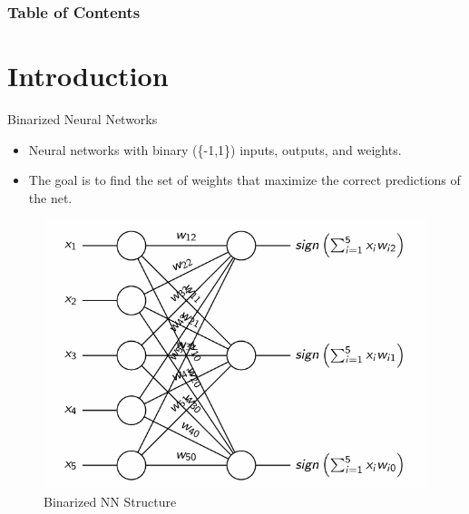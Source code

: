 \documentclass[12pt]{beamer}
\begin{document}


\frame{\titlepage}

\begin{frame}
    \frametitle{Table of Contents}
    \tableofcontents
    \end{frame}
    
\section{Introduction}
\begin{frame}{Binarized Neural Networks}
\vspace{-0.2cm}
\begin{itemize}
    \item Neural networks with binary (\{-1,1\}) inputs, outputs, and weights.
    \item The goal is to find the set of weights that maximize the correct predictions of the net.
\end{itemize}
\vspace{-0.2cm}
\begin{figure}[H]
        \centering
        \includegraphics[height=0.55\textheight]{image/bnn}
        \caption{Binarized NN Structure}
    \end{figure}
\end{frame}
\end{document}
